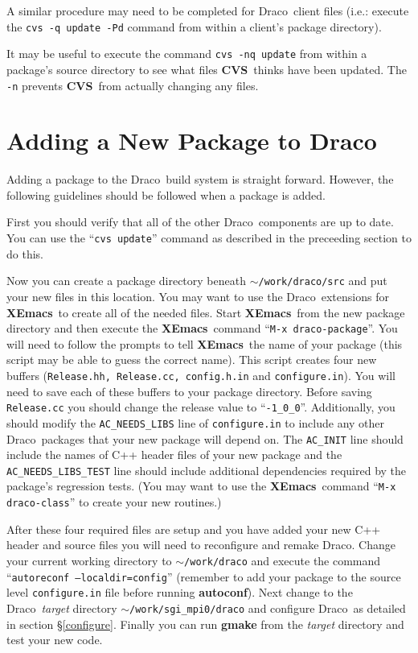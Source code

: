 \documentclass[11pt]{nmemo}
\newcommand{\comp}[1]{\normalfont\normalsize\texttt{#1}}
\newcommand{\draco}{{\normalfont\sffamily Draco}}
\newcommand{\cvs}{{\normalfont\bfseries CVS}}
\newcommand{\xemacs}{{\normalfont\bfseries XEmacs}}
\begin{document}
A similar procedure may need to be completed for \draco\ client files
(i.e.: execute the \comp{cvs -q update -Pd} command from within a
client's package directory).

It may be useful to execute the command \comp{cvs -nq update} from
within a package's source directory to see what files \cvs\ thinks
have been updated.  The \comp{-n} prevents \cvs\ from actually
changing any files.


\section{Adding a New Package to Draco}

Adding a package to the \draco\ build system is straight forward.
However, the following guidelines should be followed when a package is
added.

First you should verify that all of the other \draco\ components are
up to date.  You can use the ``\comp{cvs update}'' command as described in
the preceeding section to do this.  

Now you can create a package directory beneath
\comp{$\sim$/work/draco/src} and put your new files in this location.
You may want to use the \draco\ extensions for \xemacs\ to create all
of the needed files.  Start \xemacs\ from the new package directory
and then execute the \xemacs\ command ``\comp{M-x draco-package}''.
You will need to follow the prompts to tell \xemacs\ the name of your
package (this script may be able to guess the correct name).  This
script creates four new buffers (\comp{Release.hh, Release.cc,
  config.h.in} and \comp{configure.in}).  You will need to save each
of these buffers to your package directory.  Before saving
\comp{Release.cc} you should change the release value to
``\comp{-1\_0\_0}''.  Additionally, you should modify the
\comp{AC\_NEEDS\_LIBS} line of \comp{configure.in} to include any
other \draco\ packages that your new package will depend on.  The
\comp{AC\_INIT} line should include the names of C++ header files of
your new package and the \comp{AC\_NEEDS\_LIBS\_TEST} line should
include additional dependencies required by the package's regression
tests.  (You may want to use the \xemacs\ command ``\comp{M-x
  draco-class}'' to create your new routines.)

After these four required files are setup and you have added your new
C++ header and source files you will need to reconfigure and remake
\draco.  Change your current working directory to
\comp{$\sim$/work/draco} and execute the command ``\comp{autoreconf
  --localdir=config}'' (remember to add your package to the source
level \comp{configure.in} file before running \textbf{autoconf}).
Next change to the \draco\ \emph{target} directory
\comp{$\sim$/work/sgi\_mpi0/draco} and configure \draco\ as detailed
in section \S\ref{configure}.  Finally you can run \textbf{gmake} from
the \emph{target} directory and test your new code.
\end{document}
